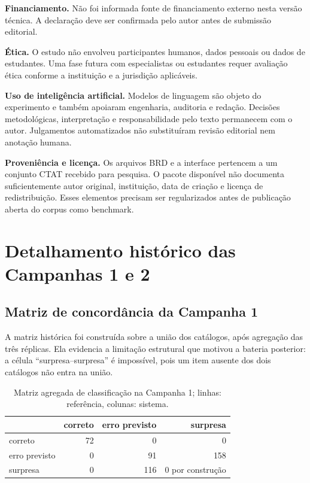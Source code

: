 \documentclass[11pt,a4paper]{article}
\begin{document}
\textbf{Financiamento.} Não foi informada fonte de financiamento externo nesta versão técnica. A declaração deve ser confirmada pelo autor antes de submissão editorial.

\textbf{Ética.} O estudo não envolveu participantes humanos, dados pessoais ou dados de estudantes. Uma fase futura com especialistas ou estudantes requer avaliação ética conforme a instituição e a jurisdição aplicáveis.

\textbf{Uso de inteligência artificial.} Modelos de linguagem são objeto do experimento e também apoiaram engenharia, auditoria e redação. Decisões metodológicas, interpretação e responsabilidade pelo texto permanecem com o autor. Julgamentos automatizados não substituíram revisão editorial nem anotação humana.

\textbf{Proveniência e licença.} Os arquivos BRD e a interface pertencem a um conjunto CTAT recebido para pesquisa. O pacote disponível não documenta suficientemente autor original, instituição, data de criação e licença de redistribuição. Esses elementos precisam ser regularizados antes de publicação aberta do corpus como benchmark.

\appendix

\section{Detalhamento histórico das Campanhas 1 e 2}

\subsection{Matriz de concordância da Campanha 1}

A matriz histórica foi construída sobre a união dos catálogos, após agregação das três réplicas. Ela evidencia a limitação estrutural que motivou a bateria posterior: a célula ``surpresa--surpresa'' é impossível, pois um item ausente dos dois catálogos não entra na união.

\begin{table}[htbp]
\centering
\caption{Matriz agregada de classificação na Campanha 1; linhas: referência, colunas: sistema.}
\label{tab:c1-matrix}
\small
\setlength{\tabcolsep}{8pt}
\begin{tabular}{@{}lrrr@{}}
\toprule
 & correto & erro previsto & surpresa \\
\midrule
correto & 72 & 0 & 0 \\
erro previsto & 0 & 91 & 158 \\
surpresa & 0 & 116 & 0 por construção \\
\bottomrule
\end{tabular}
\end{table}
\end{document}
